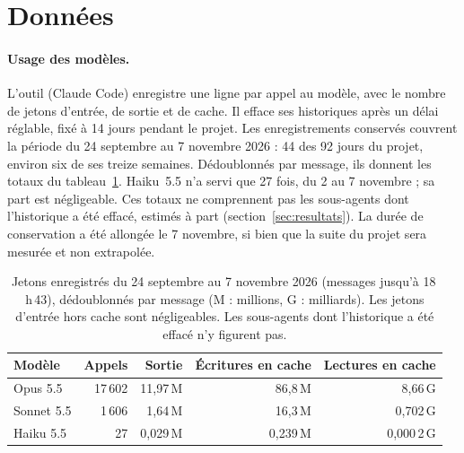 \documentclass[11pt,a4paper]{article}
\begin{document}
\section{Données}

\paragraph{Usage des modèles.} L'outil (Claude Code) enregistre une ligne par appel au modèle, avec le nombre de jetons d'entrée, de sortie et de cache. Il efface ses historiques après un délai réglable, fixé à 14 jours pendant le projet. Les enregistrements conservés couvrent la période du 24 septembre au 7 novembre 2026 : 44 des 92 jours du projet, environ six de ses treize semaines. Dédoublonnés par message, ils donnent les totaux du tableau~\ref{tab:jetons}. Haiku~5.5 n'a servi que 27 fois, du 2 au 7 novembre ; sa part est négligeable. Ces totaux ne comprennent pas les sous-agents dont l'historique a été effacé, estimés à part (section~\ref{sec:resultats}). La durée de conservation a été allongée le 7 novembre, si bien que la suite du projet sera mesurée et non extrapolée.

\begin{table}[h]\centering
\begin{tabular}{lrrrr}
\toprule
Modèle & Appels & Sortie & Écritures en cache & Lectures en cache\\
\midrule
Opus 5.5 & 17\,602 & 11,97\,M & 86,8\,M & 8,66\,G\\
Sonnet 5.5 & 1\,606 & 1,64\,M & 16,3\,M & 0,702\,G\\
Haiku 5.5 & 27 & 0,029\,M & 0,239\,M & 0,000\,2\,G\\
\bottomrule
\end{tabular}
\caption{Jetons enregistrés du 24 septembre au 7 novembre 2026 (messages jusqu'à 18\,h\,43), dédoublonnés par message (M : millions, G : milliards). Les jetons d'entrée hors cache sont négligeables. Les sous-agents dont l'historique a été effacé n'y figurent pas.}\label{tab:jetons}
\end{table}
\end{document}
